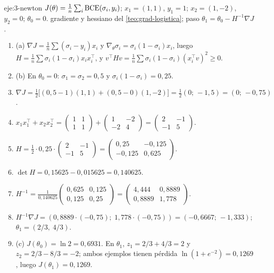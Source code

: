 \begin{solucion}{eje:3-newton}
\datos $J(\theta)=\frac1n\sum_i\operatorname{BCE}(\sigma_i,y_i)$; $x_1=(1,1)$, $y_1=1$; $x_2=(1,-2)$, $y_2=0$; $\theta_0=0$.
\planteamiento gradiente y hessiano del \cref{teo:grad-logistica}; paso $\theta_1=\theta_0-H^{-1}\nabla J$.
\pasos
\begin{enumerate}[label=\arabic*.]
  \item (a) $\nabla J=\frac1n\sum(\sigma_i-y_i)x_i$ y $\nabla_\theta\sigma_i=\sigma_i(1-\sigma_i)x_i$, luego $H=\frac1n\sum\sigma_i(1-\sigma_i)x_ix_i^{\top}$, y $v^{\top}Hv=\frac1n\sum\sigma_i(1-\sigma_i)(x_i^{\top}v)^{2}\ge 0$.
  \item (b) En $\theta_0=0$: $\sigma_1=\sigma_2=0{,}5$ y $\sigma_i(1-\sigma_i)=0{,}25$.
  \item $\nabla J=\frac12\bigl[(0{,}5-1)(1,1)+(0{,}5-0)(1,-2)\bigr]=\frac12(0;\,-1{,}5)=(0;\,-0{,}75)$.
  \item $x_1x_1^{\top}+x_2x_2^{\top}=\begin{pmatrix}1&1\\1&1\end{pmatrix}+\begin{pmatrix}1&-2\\-2&4\end{pmatrix}=\begin{pmatrix}2&-1\\-1&5\end{pmatrix}$.
  \item $H=\frac12\cdot 0{,}25\cdot\begin{pmatrix}2&-1\\-1&5\end{pmatrix}=\begin{pmatrix}0{,}25&-0{,}125\\-0{,}125&0{,}625\end{pmatrix}$.
  \item $\det H=0{,}15625-0{,}015625=0{,}140625$.
  \item $H^{-1}=\frac{1}{0{,}140625}\begin{pmatrix}0{,}625&0{,}125\\0{,}125&0{,}25\end{pmatrix}=\begin{pmatrix}4{,}444&0{,}8889\\0{,}8889&1{,}778\end{pmatrix}$.
  \item $H^{-1}\nabla J=(0{,}8889\cdot(-0{,}75);\;1{,}778\cdot(-0{,}75))=(-0{,}6667;\,-1{,}333)$; $\theta_1=(2/3,\;4/3)$.
  \item (c) $J(\theta_0)=\ln 2=0{,}6931$. En $\theta_1$, $z_1=2/3+4/3=2$ y $z_2=2/3-8/3=-2$; ambos ejemplos tienen pérdida $\ln(1+e^{-2})=0{,}1269$, luego $J(\theta_1)=0{,}1269$.

\end{enumerate}
\end{solucion}

